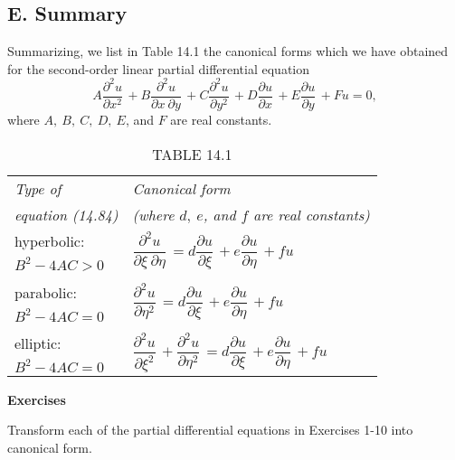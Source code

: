 \documentclass[11pt,a4paper, twoside]{report}
\newcommand{\pf}[2]{\dfrac{\partial #1}{\partial #2}\,}
\newcommand{\pfn}[3]{\dfrac{\partial^#3 #1}{\partial #2^#3}\,}
\newcommand{\pfp}[4]{\dfrac{\partial^#4 #1}{\partial #2\ \partial #3}\,}
\begin{document}
	\subsection*{E. Summary}
	Summarizing, we list in Table 14.1 the canonical forms which we have obtained for the second-order linear partial differential equation
	\begin{equation}\tag{14.84}
		A\pfn{u}{x}{2} + B\pfp{u}{x}{y}{2} + C\pfn{u}{y}{2} + D\pf{u}{x} + E\pf{u}{y} + Fu = 0,
	\end{equation}
	where $A,\ B,\ C,\ D,\ E$, and $F$ are real constants.
	\begin{table}[H]
		\captionsetup{justification=raggedright, singlelinecheck=off}
		\caption*{TABLE 14.1}
		\begin{tabular}{p{3.5cm} p{6.5cm}} 
		 \hline
		 \textit{Type of} & \textit{Canonical form}\\
		 \textit{equation (14.84)} & \textit{(where $d,\ e$, and $f$ are real constants)}\\
		 \hline
		 hyperbolic: & \multirow{2}{*}{$\pfp{u}{\xi}{\eta}{2} = d\pf{u}{\xi} + e\pf{u}{\eta} + fu$}\\
		 $B^2 - 4AC > 0$\\
		 & \\
		 parabolic: & \multirow{2}{*}{$\pfn{u}{\eta}{2} = d\pf{u}{\xi} + e\pf{u}{\eta} + fu$}\\
		 $B^2 - 4AC = 0$\\
		 & \\
		 elliptic: & \multirow{2}{*}{$\pfn{u}{\xi}{2} + \pfn{u}{\eta}{2} = d\pf{u}{\xi} + e\pf{u}{\eta} + fu$}\\
		 $B^2 - 4AC = 0$\\
		 \hline
		\end{tabular}
	\end{table}
	\textbf{Exercises}\par
	Transform each of the partial differential equations in Exercises 1-10 into canonical form.
\end{document}
